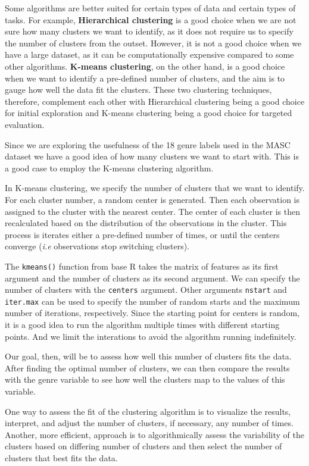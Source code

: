 \documentclass[
  letterpaper,
]{latex/krantz}
\theoremstyle{definition}
\theoremstyle{remark}
\begin{document}
Some algorithms are better suited for certain types of data and certain
types of tasks. For example, \textbf{Hierarchical clustering} is a good
choice when we are not sure how many clusters we want to identify, as it
does not require us to specify the number of clusters from the outset.
However, it is not a good choice when we have a large dataset, as it can
be computationally expensive compared to some other algorithms.
\textbf{K-means clustering}, on the other hand, is a good choice when we
want to identify a pre-defined number of clusters, and the aim is to
gauge how well the data fit the clusters. These two clustering
techniques, therefore, complement each other with Hierarchical
clustering being a good choice for initial exploration and K-means
clustering being a good choice for targeted evaluation.

Since we are exploring the usefulness of the 18 genre labels used in the
MASC dataset we have a good idea of how many clusters we want to start
with. This is a good case to employ the K-means clustering algorithm.

In K-means clustering, we specify the number of clusters that we want to
identify. For each cluster number, a random center is generated. Then
each observation is assigned to the cluster with the nearest center. The
center of each cluster is then recalculated based on the distribution of
the observations in the cluster. This process is iterates either a
pre-defined number of times, or until the centers converge (\emph{i.e}
observations stop switching clusters).

The \texttt{kmeans()} function from base R takes the matrix of features
as its first argument and the number of clusters as its second argument.
We can specify the number of clusters with the \texttt{centers}
argument. Other arguments \texttt{nstart} and \texttt{iter.max} can be
used to specify the number of random starts and the maximum number of
iterations, respectively. Since the starting point for centers is
random, it is a good idea to run the algorithm multiple times with
different starting points. And we limit the interations to avoid the
algorithm running indefinitely.

Our goal, then, will be to assess how well this number of clusters fits
the data. After finding the optimal number of clusters, we can then
compare the results with the genre variable to see how well the clusters
map to the values of this variable.

One way to assess the fit of the clustering algorithm is to visualize
the results, interpret, and adjust the number of clusters, if necessary,
any number of times. Another, more efficient, approach is to
algorithmically assess the variability of the clusters based on
differing number of clusters and then select the number of clusters that
best fits the data.
\end{document}

